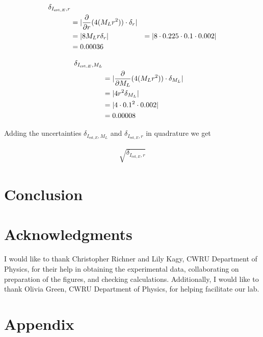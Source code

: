 \documentclass[coverpage]{article}
\begin{document}
	\begin{align}
		\delta_{I_{\text{est}, E}, r} \notag \\
		&= |\frac{\partial}{\partial r} (4 (M_L r^2)) \cdot \delta_r| \notag \\
		&= |8 M_L r \delta_r|
		&= |8 \cdot 0.225 \cdot 0.1 \cdot 0.002| \notag \\
		&= 0.00036
	\end{align}
	
	\begin{align}
		\delta_{I_{\text{est}, E}, M_L} \notag \\
		&= |\frac{\partial}{\partial M_L} (4 (M_L r^2)) \cdot \delta_{M_L}| \notag \\
		&= |4 r^2 \delta_{M_L}| \notag \\
		&= |4 \cdot 0.1^2 \cdot 0.002| \notag \\
		&= 0.00008
	\end{align}
	
	Adding the uncertainties $\delta_{I_{\text{est}, E}, M_L}$ and $\delta_{I_{\text{est}, E}, r}$ in quadrature we get
	
	\begin{align}
		\sqrt{\delta_{I_{\text{est}, E}, r}}
	\end{align}
	
	\section{Conclusion}
	
	\section*{Acknowledgments}
	I would like to thank Christopher Richner and Lily Kagy, CWRU Department of Physics, for their help in obtaining the experimental data, collaborating on preparation of the figures, and checking calculations. Additionally, I would like to thank Olivia Green, CWRU Department of Physics, for helping facilitate our lab.
	
	
	\nocite{textbook}
	\nocite{labManual}
	
	
	\onecolumn
	
	\section{Appendix} \label{sect:appendix}
		
\end{document}
